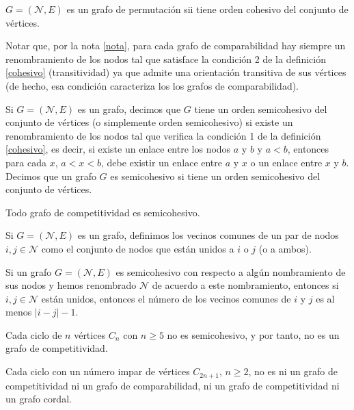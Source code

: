 \begin{teo}
$G = (\mathcal{N}, E)$ es un grafo de permutación sii tiene orden cohesivo del conjunto de vértices. 
\end{teo}

\begin{nota}
Notar que, por la nota \ref{nota}, para cada grafo de comparabilidad hay siempre un renombramiento de los nodos tal que satisface la condición 2 de la definición \ref{cohesivo} (transitividad) ya que admite una orientación transitiva de sus vértices (de hecho, esa condición caracteriza los los grafos de comparabilidad).
\end{nota}

\begin{defi}
Si $G=(\mathcal{N}, E)$ es un grafo, decimos que $G$ tiene un orden semicohesivo del conjunto de vértices (o simplemente orden semicohesivo) si existe un renombramiento de los nodos tal que verifica la condición 1 de la definición \ref{cohesivo}, es decir, si existe un enlace entre los nodos $a$ y $b$ y $a < b$, entonces para cada $x$, $a < x < b$, debe existir un enlace entre $a$ y $x$ o un enlace entre $x$ y $b$. Decimos que un grafo $G$ es semicohesivo si tiene un orden semicohesivo del conjunto de vértices. 
\end{defi}

\begin{lema}
Todo grafo de competitividad es semicohesivo.
\end{lema}

\begin{defi}
Si $G=(\mathcal{N},E)$ es un grafo, definimos los vecinos comunes de un par de nodos $i,j \in \mathcal{N}$ como el conjunto de nodos que están unidos a $i$ o $j$ (o a ambos).
\end{defi}

\begin{lema}
Si un grafo $G=(\mathcal{N},E)$ es semicohesivo con respecto a algún nombramiento de sus nodos y hemos renombrado $\mathcal{N}$ de acuerdo a este nombramiento, entonces si $i,j \in \mathcal{N}$ están unidos, entonces el número de los vecinos comunes de $i$ y $j$ es al menos $|i-j|-1$.
\end{lema}

\begin{lema}
Cada ciclo de $n$ vértices $C_n$ con $n \geq 5$ no es semicohesivo, y por tanto, no es un grafo de competitividad.
\end{lema}

\begin{lema}
Cada ciclo con un número impar de vértices $C_{2n+1}$, $n \geq 2$, no es ni un grafo de competitividad ni un grafo de comparabilidad, ni un grafo de competitividad ni un grafo cordal.
\end{lema}

